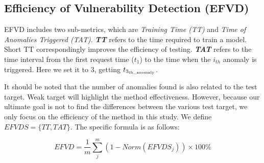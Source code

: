 \subsection{\textbf{Efficiency of Vulnerability Detection (EFVD)}}
EFVD includes two sub-metrics, which are \textit{Training Time (TT)} and \textit{Time of Anomalies Triggered (TAT)}. \textit{\textbf{TT}} refers to the time required to train a model. Short TT correspondingly improves the efficiency of testing. \textit{\textbf{TAT}} refers to the time interval from the first request time (${t_1}$) to the time when the $i_{th}$ anomaly is triggered. Here we set it to 3, getting ${t_{{3_{{\rm{th\_anomaly}}}}}}$. 

It should be noted that the number of anomalies found is also related to the test target. Weak target will highlight the method effectiveness. However, because our ultimate goal is not to find the differences between the various test target, we only focus on the efficiency of the method in this study. We define $EFVDS=\{TT, TAT\}$. The specific formula is as follows:

\begin{equation}
EFVD = \frac{1}{m}\sum_{j}^{m}(1-Norm(EFVDS_j))\times100\%
\end{equation}


